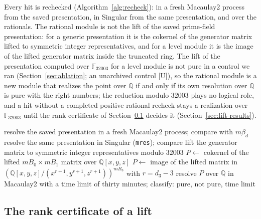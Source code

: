 \documentclass[11pt]{article}
\theoremstyle{definition}
\theoremstyle{remark}
\newcommand{\Q}{\mathbb{Q}}
\newcommand{\F}{\mathbb{F}}
\begin{document}
Every hit is rechecked (Algorithm~\ref{alg:recheck}): in a fresh Macaulay2 process from the saved presentation, in Singular from the same presentation, and over the rationals. The rational module is not the lift of the saved prime-field presentation: for a generic presentation it is the cokernel of the generator matrix lifted to symmetric integer representatives, and for a level module it is the image of the lifted generator matrix inside the truncated ring. The lift of the presentation computed over $\F_{32003}$ for a level module is not pure in a control we ran (Section~\ref{sec:ablation}; an unarchived control [U]), so the rational module is a new module that realizes the point over $\Q$ if and only if its own resolution over $\Q$ is pure with the right numbers; the reduction modulo $32003$ plays no logical role, and a hit without a completed positive rational recheck stays a realization over $\F_{32003}$ until the rank certificate of Section~\ref{sec:rank} decides it (Section~\ref{sec:lift-results}).

\begin{algorithm}[htbp]
\caption{Recheck of one hit. Input: a saved hit (generator matrix over $\F_{32003}$, ray, multiple, generator type). Output: three results on the pure table, and the rational module with its table.}
\label{alg:recheck}
\begin{algorithmic}[1]
\State resolve the saved presentation in a fresh Macaulay2 process; compare with $m\beta_d$
\State resolve the same presentation in Singular (\texttt{mres}); compare
\State lift the generator matrix to symmetric integer representatives modulo $32003$
\State $P\gets$ cokernel of the lifted $mB_0\times mB_1$ matrix over $\Q[x,y,z]$
\Else\State $P\gets$ image of the lifted matrix in $(\Q[x,y,z]/(x^{r+1},y^{r+1},z^{r+1}))^{mB_3}$ with $r=d_3-3$
\EndIf
\State resolve $P$ over $\Q$ in Macaulay2 with a time limit of thirty minutes; classify: pure, not pure, time limit
\end{algorithmic}
\end{algorithm}

\subsection{The rank certificate of a lift}
\label{sec:rank}
\end{document}
